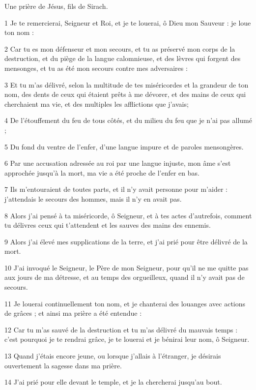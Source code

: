\par Une prière de Jésus, fils de Sirach.

\par 1 Je te remercierai, Seigneur et Roi, et je te louerai, ô Dieu mon Sauveur : je loue ton nom :
\par 2 Car tu es mon défenseur et mon secours, et tu as préservé mon corps de la destruction, et du piège de la langue calomnieuse, et des lèvres qui forgent des mensonges, et tu as été mon secours contre mes adversaires :
\par 3 Et tu m'as délivré, selon la multitude de tes miséricordes et la grandeur de ton nom, des dents de ceux qui étaient prêts à me dévorer, et des mains de ceux qui cherchaient ma vie, et des multiples les afflictions que j'avais;
\par 4 De l'étouffement du feu de tous côtés, et du milieu du feu que je n'ai pas allumé ;
\par 5 Du fond du ventre de l'enfer, d'une langue impure et de paroles mensongères.
\par 6 Par une accusation adressée au roi par une langue injuste, mon âme s'est approchée jusqu'à la mort, ma vie a été proche de l'enfer en bas.
\par 7 Ils m'entouraient de toutes parts, et il n'y avait personne pour m'aider : j'attendais le secours des hommes, mais il n'y en avait pas.
\par 8 Alors j'ai pensé à ta miséricorde, ô Seigneur, et à tes actes d'autrefois, comment tu délivres ceux qui t'attendent et les sauves des mains des ennemis.
\par 9 Alors j'ai élevé mes supplications de la terre, et j'ai prié pour être délivré de la mort.
\par 10 J'ai invoqué le Seigneur, le Père de mon Seigneur, pour qu'il ne me quitte pas aux jours de ma détresse, et au temps des orgueilleux, quand il n'y avait pas de secours.
\par 11 Je louerai continuellement ton nom, et je chanterai des louanges avec actions de grâces ; et ainsi ma prière a été entendue :
\par 12 Car tu m'as sauvé de la destruction et tu m'as délivré du mauvais temps : c'est pourquoi je te rendrai grâce, je te louerai et je bénirai leur nom, ô Seigneur.
\par 13 Quand j'étais encore jeune, ou lorsque j'allais à l'étranger, je désirais ouvertement la sagesse dans ma prière.
\par 14 J'ai prié pour elle devant le temple, et je la chercherai jusqu'au bout.
